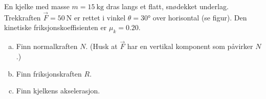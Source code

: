 %
En kjelke med masse $m = \SI{15}{\kilo\gram}$ dras langs et flatt, snødekket underlag. Trekkraften $\vec{F} = \SI{50}{\newton}$ er rettet i vinkel $\theta = 30°$ over horisontal (se figur). Den kinetiske friksjonskoeffisienten er $\mu_k = 0.20$.
\begin{enumerate}[a)]
    \item Finn normalkraften $N$. (Husk at $\vec{F}$ har en vertikal komponent som påvirker $N$.)
    \item Finn friksjonskraften $R$.
    \item Finn kjelkens akselerasjon.
\end{enumerate}
